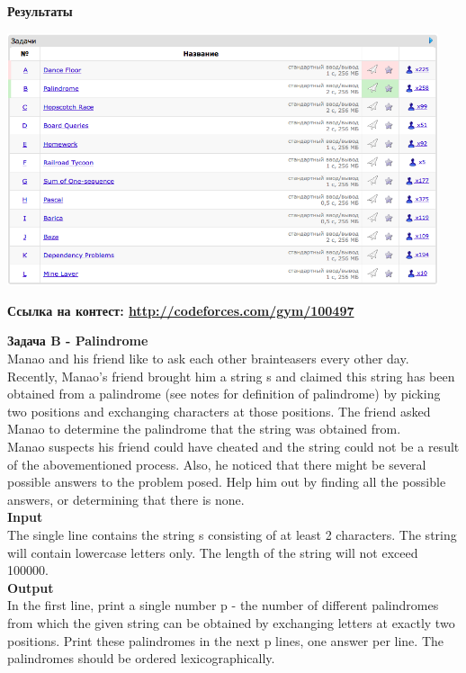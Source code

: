 \documentclass[a4paper,12pt]{article}
\begin{document}
\textbf{{\large Результаты}} \\
\begin{center}
\includegraphics[width=0.95\textwidth]{CT_S02E04/CT_S02E04_result.png}\\ [1cm]
\end{center}

\textbf{{\large Ссылка на контест: \url{http://codeforces.com/gym/100497}}}


\newpage
\textbf{{\large Задача B - Palindrome}} \\

Manao and his friend like to ask each other brainteasers every other day. Recently, Manao's friend brought him a string s and claimed this string has been obtained from a palindrome (see notes for definition of palindrome) by picking two positions and exchanging characters at those positions. The friend asked Manao to determine the palindrome that the string was obtained from. \\

Manao suspects his friend could have cheated and the string could not be a result of the abovementioned process. Also, he noticed that there might be several possible answers to the problem posed. Help him out by finding all the possible answers, or determining that there is none. \\

\textbf{Input} \\
The single line contains the string s consisting of
at least 2 characters. The string will contain lowercase letters only. The length of the string will not exceed 100000. \\

\textbf{Output} \\
In the first line, print a single number p - the number of different palindromes from which the given string can be obtained by exchanging letters at exactly two positions. Print these palindromes in the next p lines, one answer per line. The palindromes should be ordered lexicographically. \\
\end{document}
